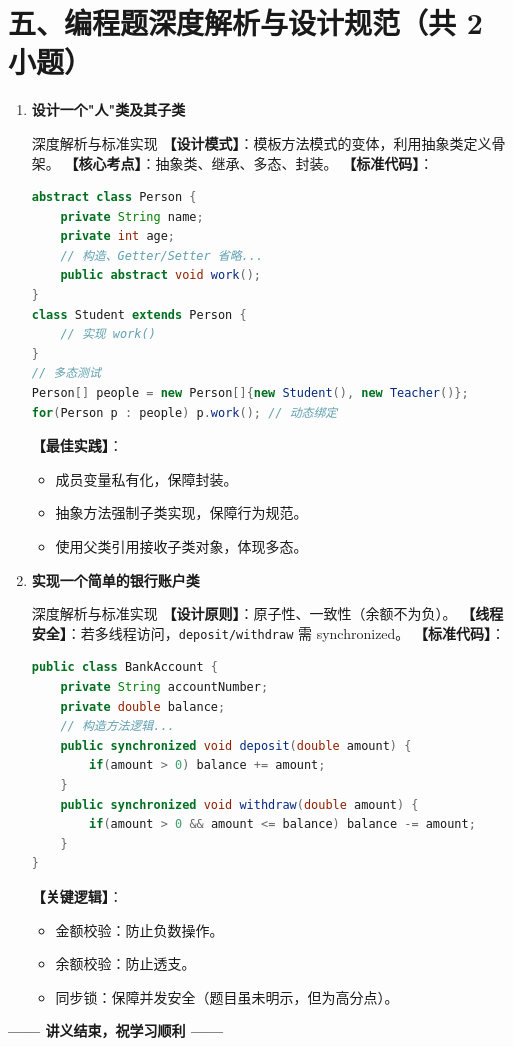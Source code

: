 ﻿\documentclass[12pt, a4paper]{ctexart}
\newcommand{\code}[1]{\texttt{#1}}
\begin{document}
\section*{五、编程题深度解析与设计规范（共 2 小题）}

\begin{enumerate}[label=\textbf{\arabic*.}, itemsep=1em]
	\item \textbf{设计一个"人"类及其子类}
	      \begin{bluebox}{深度解析与标准实现}
		      \textbf{【设计模式】}：模板方法模式的变体，利用抽象类定义骨架。
		      \textbf{【核心考点】}：抽象类、继承、多态、封装。
		      \textbf{【标准代码】}：
		      \begin{lstlisting}[language=Java]
abstract class Person {
    private String name;
    private int age;
    // 构造、Getter/Setter 省略...
    public abstract void work();
}
class Student extends Person {
    // 实现 work()
}
// 多态测试
Person[] people = new Person[]{new Student(), new Teacher()};
for(Person p : people) p.work(); // 动态绑定
    \end{lstlisting}
		      \textbf{【最佳实践】}：
		      \begin{itemize}[leftmargin=*, nosep]
			      \item 成员变量私有化，保障封装。
			      \item 抽象方法强制子类实现，保障行为规范。
			      \item 使用父类引用接收子类对象，体现多态。
		      \end{itemize}
	      \end{bluebox}

	\item \textbf{实现一个简单的银行账户类}
	      \begin{bluebox}{深度解析与标准实现}
		      \textbf{【设计原则】}：原子性、一致性（余额不为负）。
		      \textbf{【线程安全】}：若多线程访问，\code{deposit/withdraw} 需 synchronized。
		      \textbf{【标准代码】}：
		      \begin{lstlisting}[language=Java]
public class BankAccount {
    private String accountNumber;
    private double balance;
    // 构造方法逻辑...
    public synchronized void deposit(double amount) {
        if(amount > 0) balance += amount;
    }
    public synchronized void withdraw(double amount) {
        if(amount > 0 && amount <= balance) balance -= amount;
    }
}
    \end{lstlisting}
		      \textbf{【关键逻辑】}：
		      \begin{itemize}[leftmargin=*, nosep]
			      \item 金额校验：防止负数操作。
			      \item 余额校验：防止透支。
			      \item 同步锁：保障并发安全（题目虽未明示，但为高分点）。
		      \end{itemize}
	      \end{bluebox}
\end{enumerate}

\vfill
\begin{center}
	\bfseries —— 讲义结束，祝学习顺利 ——
\end{center}
\end{document}
